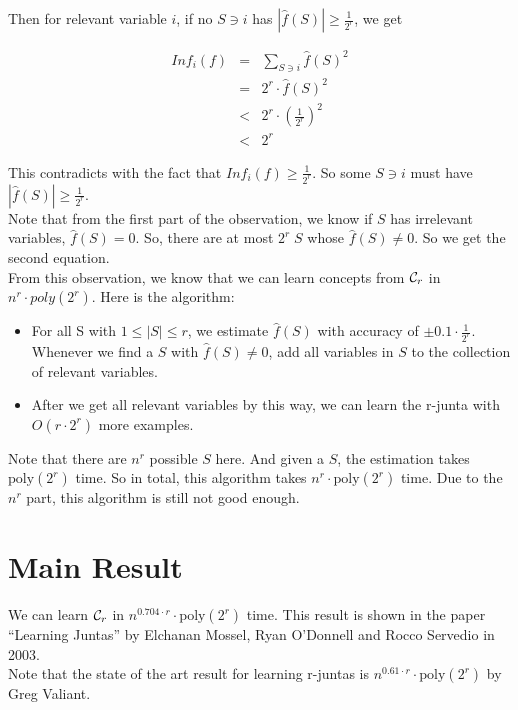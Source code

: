 \documentclass[12pt]{article}
\newcommand{\calc}{{\cal C}}
\newcommand{\poly}{\mathrm{poly}}
\begin{document}
Then for relevant variable $i$, if no $S \ni i$ has $|\hat {f}(S)| \ge
\frac {1}{2^r}$, we get

\begin{eqnarray*}
Inf_i(f)
&=& \sum_{S \ni i} \hat {f}(S)^2 \\
&=& 2^r \cdot \hat {f}(S)^2 \\
&<& 2^r \cdot (\frac{1}{2^r})^2 \\
&<& 2^r
\end{eqnarray*}

This contradicts with the fact that $Inf_i(f) \ge \frac{1}{2^r}$. So
some $S \ni i$ must have $|\hat {f}(S)| \ge \frac {1}{2^r}$. \\

Note that from the first part of the observation, we know if $S$ has
irrelevant variables, $\hat {f}(S) = 0$. So, there are at most 
$2^r \; S$ whose $\hat {f}(S) \neq 0$. So we get the second
equation. \\

From this observation, we know that we can learn concepts from
$\calc_r$ in $n^r \cdot poly(2^r)$. Here is the algorithm:

\begin{itemize}
\item For all S with $1 \le |S| \le r$, we estimate $\hat {f}(S)$
  with accuracy of $\pm 0.1 \cdot \frac {1}{2^r}$. Whenever we find
  a $S$ with $\hat {f}(S) \neq 0$, add all variables in $S$ to the
  collection of relevant variables.
\item After we get all relevant variables by this way, we can learn
  the r-junta with $O(r \cdot 2^r)$ more examples.
\end{itemize}

Note that there are $n^r$ possible $S$ here. And given a $S$, the
estimation takes $\poly (2^r)$ time. So in total, this algorithm takes
$n^r \cdot \poly (2^r)$ time. Due to the $n^r$ part, this algorithm is
still not good enough.

\section{Main Result}

We can learn $\calc_r$ in $n^{0.704 \cdot r} \cdot \poly(2^r)$
time. This result is shown in the paper ``Learning Juntas'' by
Elchanan Mossel, Ryan O'Donnell and Rocco Servedio in 2003. \\

Note that the state of the art result for learning r-juntas is
$n^{0.61 \cdot r} \cdot \poly(2^r)$ by Greg Valiant. 
\end{document}
